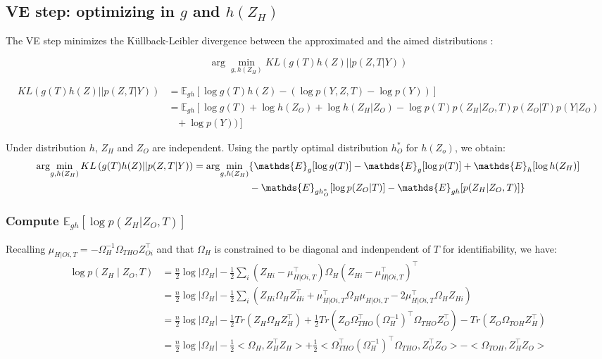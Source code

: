 \documentclass[11pt,a4paper]{article}
\newcommand{\argmin}{\arg\!\min}
\newcommand{\Esp}{\mathds{E}}
\begin{document}
\subsection{VE step: optimizing in $g$ and $h(Z_H)$}
The VE step minimizes the Küllback-Leibler divergence between the approximated and the aimed distributions :

$$  \argmin_{g,h(Z_H)} KL\left(g(T)h(Z) || p(Z,T|Y)\right)$$


\begin{align*}
KL\left(g(T)h(Z) || p(Z,T|Y)\right) &= \Esp_{gh}\left[\log g(T)h(Z) - (\log p(Y,Z,T) - \log p(Y) ) \right]\\
&=\Esp_{gh}\left[\log g(T) + \log h(Z_O)+ \log h(Z_H|Z_O) - \log p(T)p(Z_H|Z_O,T)p(Z_O|T)p(Y|Z_O)\right. \\
& \;\;\;+ \log p(Y) )\left. \right]
\end{align*}

Under distribution $h$, $Z_H$ and $Z_O$ are independent. Using the partly optimal distribution $h_O^*$ for $h(Z_o)$, we obtain:
\begin{align*}
\argmin_{g,h(Z_H)} KL\left(g(T)h(Z) || p(Z,T|Y)\right) &=\argmin_{g,h(Z_H)} \{ \Esp_g[\log g(T)] - \Esp_g[\log p(T)] + \Esp_h[\log h(Z_H)]  \\
& \text{\hspace{2cm}}   - \Esp_{gh_O^*}[\log p(Z_O|T)] - \Esp_{gh}[ p(Z_H|Z_O,T)]  \}\\
\end{align*}

\subsubsection{Compute $\Esp_{gh}[\log p(Z_H | Z_O,T) ]$}
Recalling $\mu_{H|Oi,T} = -\Omega_H^{-1}\Omega_{THO}Z_{Oi} ^\intercal $ and that $\Omega_H$ is constrained to be diagonal and indenpendent of $T$ for identifiability, we have:
\begin{align*}
\log p(Z_H\mid Z_O,T) &= \frac{n}{2} \log |\Omega_H| -\frac{1}{2} \sum_i (Z_{Hi}-\mu_{H|Oi,T}^\intercal )\Omega_H(Z_{Hi}-\mu_{H|Oi,T}^\intercal )^\intercal \\
&= \frac{n}{2} \log |\Omega_H| -\frac{1}{2} \sum_i \left(Z_{Hi}\Omega_HZ_{Hi}^\intercal  + \mu_{H|Oi,T}^\intercal \Omega_H\mu_{H|Oi,T} - 2\mu_{H|Oi,T}^\intercal \Omega_HZ_{Hi} \right)\\
&= \frac{n}{2} \log |\Omega_H| -\frac{1}{2}Tr(Z_H\Omega_HZ_H^\intercal ) + \frac{1}{2} Tr(Z_O\Omega_{THO}^\intercal (\Omega_H^{-1})^\intercal \Omega_{THO}Z_O^\intercal ) - Tr(Z_O\Omega_{TOH}Z_H^\intercal)\\
&=\frac{n}{2} \log |\Omega_H| -\frac{1}{2}<\Omega_H,Z_H^\intercal Z_H> + \frac{1}{2} <\Omega_{THO}^\intercal (\Omega_H^{-1})^\intercal \Omega_{THO},Z_O^\intercal Z_O>- <\Omega_{TOH},Z_H^\intercal Z_O>
\end{align*}
\end{document}
